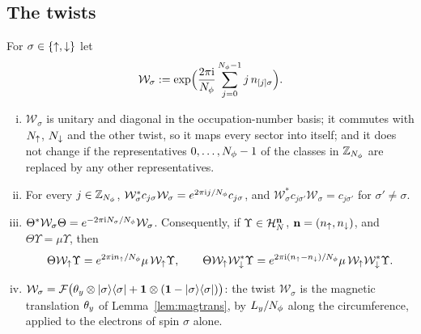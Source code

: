\subsection{The twists}

\begin{lemma}\label{lem:twists}
For $\sigma\in\{{\uparrow},{\downarrow}\}$ let
\[
\mathcal W_\sigma:=\exp\Bigl(\frac{2\pi\mathrm{i}}{N_{\phi}}\sum_{j=0}^{N_{\phi}-1}j\,n_{[j]\sigma}\Bigr).
\]
\begin{enumerate}[(i)]
\item $\mathcal W_\sigma$ is unitary and diagonal in the occupation-number basis; it commutes with $N_{\uparrow}$, $N_{\downarrow}$ and the
other twist, so it maps every sector into itself; and it does not change if the representatives $0,\dots,N_{\phi}-1$ of
the classes in $\mathbb{Z}_{N_{\phi}}$ are replaced by any other representatives.
\item For every $j\in\mathbb{Z}_{N_{\phi}}$, $\mathcal W_\sigma^*c_{j\sigma}\mathcal W_\sigma=e^{2\pi\mathrm{i} j/N_{\phi}}c_{j\sigma}$, and
$\mathcal W_\sigma^*c_{j\sigma'}\mathcal W_\sigma=c_{j\sigma'}$ for $\sigma'\ne\sigma$.
\item $\Theta^*\mathcal W_\sigma\Theta=e^{-2\pi\mathrm{i} N_\sigma/N_{\phi}}\mathcal W_\sigma$. Consequently, if $\Upsilon\in\mathcal{H}_N^{\mathbf{n}}$,
$\mathbf{n}=(n_{\uparrow},n_{\downarrow})$, and $\Theta\Upsilon=\mu\Upsilon$, then
\[
\Theta\mathcal W_{\uparrow}\Upsilon=e^{2\pi\mathrm{i} n_{\uparrow}/N_{\phi}}\mu\,\mathcal W_{\uparrow}\Upsilon,\qquad
\Theta\mathcal W_{\uparrow}\mathcal W_{\downarrow}^*\Upsilon=e^{2\pi\mathrm{i}(n_{\uparrow}-n_{\downarrow})/N_{\phi}}\mu\,\mathcal W_{\uparrow}\mathcal W_{\downarrow}^*\Upsilon .
\]
\item $\mathcal W_\sigma=\mathcal{F}\bigl(\theta_y\otimes\lvert\sigma\rangle\langle\sigma\rvert+\mathbf{1}\otimes(\mathbf{1}-\lvert\sigma\rangle\langle\sigma\rvert)\bigr)$:
the twist $\mathcal W_\sigma$ is the magnetic translation $\theta_y$ of Lemma~\ref{lem:magtrans}, by $L_y/N_{\phi}$ along the
circumference, applied to the electrons of spin $\sigma$ alone.
\end{enumerate}
\end{lemma}

